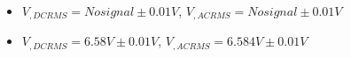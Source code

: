 \begin{itemize}
     \item $V_{, DCRMS}=No signal\pm 0.01\unit{V}$, $V_{, ACRMS}=No signal\pm 0.01\unit{V}$ 
     \item $V_{, DCRMS}=6.58V\pm 0.01\unit{V}$, $V_{, ACRMS}=6.584V\pm 0.01\unit{V}$\\
\end{itemize}
